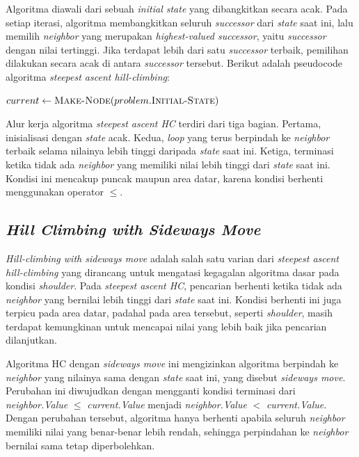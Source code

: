 Algoritma diawali dari sebuah \textit{initial state} yang dibangkitkan secara acak. Pada setiap iterasi, algoritma membangkitkan seluruh \textit{successor} dari \textit{state} saat ini, lalu memilih \textit{neighbor} yang merupakan \textit{highest-valued successor}, yaitu \textit{successor} dengan nilai tertinggi. Jika terdapat lebih dari satu \textit{successor} terbaik, pemilihan dilakukan secara acak di antara \textit{successor} tersebut. Berikut adalah pseudocode algoritma \textit{steepest ascent hill-climbing}:

\begin{algorithm}[H]
\caption{Hill-Climbing (Steepest Ascent)}
\label{alg:hill-climbing}
$current \gets \textsc{Make-Node}(problem.\textsc{Initial-State})$\;
\end{algorithm}

Alur kerja algoritma \textit{steepest ascent HC} terdiri dari tiga bagian. Pertama, inisialisasi dengan \textit{state} acak. Kedua, \textit{loop} yang terus berpindah ke \textit{neighbor} terbaik selama nilainya lebih tinggi daripada \textit{state} saat ini. Ketiga, terminasi ketika tidak ada \textit{neighbor} yang memiliki nilai lebih tinggi dari \textit{state} saat ini. Kondisi ini mencakup puncak maupun area datar, karena kondisi berhenti menggunakan operator $\leq$.

\subsection{\textit{Hill Climbing with Sideways Move}}

\textit{Hill-climbing with sideways move} adalah salah satu varian dari \textit{steepest ascent hill-climbing} yang dirancang untuk mengatasi kegagalan algoritma dasar pada kondisi \textit{shoulder}. Pada \textit{steepest ascent HC}, pencarian berhenti ketika tidak ada \textit{neighbor} yang bernilai lebih tinggi dari \textit{state} saat ini. Kondisi berhenti ini juga terpicu pada area datar, padahal pada area tersebut, seperti \textit{shoulder}, masih terdapat kemungkinan untuk mencapai nilai yang lebih baik jika pencarian dilanjutkan.

Algoritma HC dengan \textit{sideways move} ini mengizinkan algoritma berpindah ke \textit{neighbor} yang nilainya sama dengan \textit{state} saat ini, yang disebut \textit{sideways move}. Perubahan ini diwujudkan dengan mengganti kondisi terminasi dari \textit{neighbor.Value} $\leq$ \textit{current.Value} menjadi \textit{neighbor.Value} $<$ \textit{current.Value}. Dengan perubahan tersebut, algoritma hanya berhenti apabila seluruh \textit{neighbor} memiliki nilai yang benar-benar lebih rendah, sehingga perpindahan ke \textit{neighbor} bernilai sama tetap diperbolehkan.

